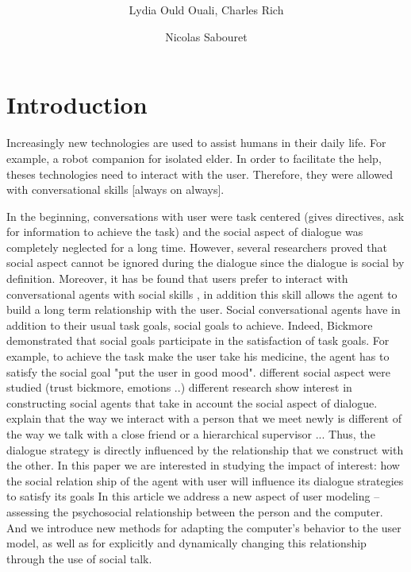 \documentclass{llncs}
\begin{document}
\title{  \vskip -10pt}

\author{Lydia Ould Ouali, Charles Rich \and
Nicolas Sabouret }

\maketitle 
\begin{abstract}\vskip -20pt
  
\end{abstract}

\section{Introduction}
Increasingly new technologies are used to assist humans in their daily life. For example, a robot companion for isolated elder. In order to facilitate the help, theses technologies need to interact with the user. Therefore, they were allowed with conversational skills [always on always]. 
\par In the beginning, conversations with user were task centered (gives directives, ask for information to achieve the task) and the social aspect of dialogue was completely neglected for a long time. However, several researchers proved that social aspect cannot be ignored during the dialogue since the dialogue is social by definition. Moreover, it has be found that users prefer to interact with  conversational agents with social skills \cite{moon}, in addition this skill allows the agent to build a long term relationship with the user\cite{bickmore}. 
Social conversational agents have in addition to their usual task goals, social goals to achieve. Indeed, Bickmore demonstrated  that social goals participate in the satisfaction of task goals. For example, to achieve the task make the user take his medicine, the agent has to satisfy the social goal "put the user in good mood".
different social aspect were studied (trust bickmore, emotions ..)
different research show interest in constructing social agents that take in account the social aspect of dialogue.
explain that the way we interact with a person that we meet newly is different of the way we talk with a close friend or a hierarchical supervisor ...
Thus, the dialogue strategy is directly influenced by the relationship that we construct with the other.  
In this paper we are interested in studying the impact of 
interest: how the social relation ship of the agent with user will influence its dialogue strategies to satisfy its goals
In this article we address a new aspect of user modeling – assessing the psychosocial
relationship between the person and the computer. And we introduce new methods
for adapting the computer’s behavior to the user model, as well as for explicitly and
dynamically changing this relationship through the use of social talk. 
\end{document}
